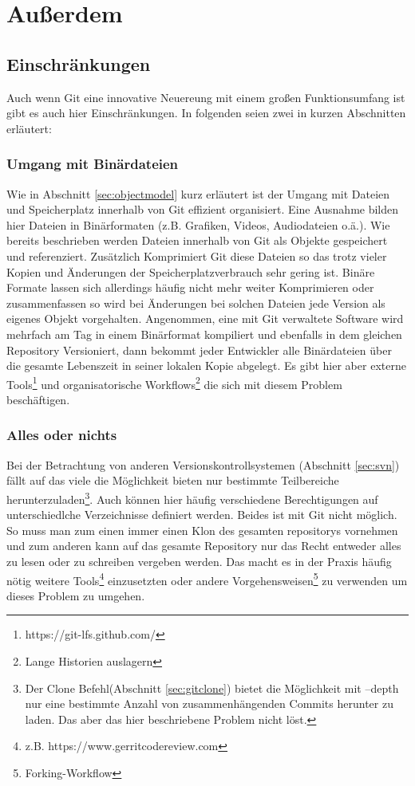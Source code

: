 \chapter{Außerdem}\label{cha:lookout}
\section{Einschränkungen}\label{sec:problems}
Auch wenn Git eine innovative Neuereung mit einem großen Funktionsumfang ist
gibt es auch hier Einschränkungen. In folgenden seien zwei in kurzen
Abschnitten erläutert:

\subsection{Umgang mit Binärdateien}\label{sec:binaries}
Wie in Abschnitt \ref{sec:objectmodel} kurz erläutert ist der Umgang mit
Dateien und Speicherplatz innerhalb von Git effizient organisiert. Eine
Ausnahme bilden hier Dateien in Binärformaten (z.B.  Grafiken, Videos,
Audiodateien o.ä.). Wie bereits beschrieben werden Dateien innerhalb von Git
als Objekte gespeichert und referenziert. Zusätzlich Komprimiert Git diese
Dateien so das trotz vieler Kopien und Änderungen der Speicherplatzverbrauch
sehr gering ist. Binäre Formate lassen sich allerdings häufig nicht mehr weiter
Komprimieren oder zusammenfassen so wird bei Änderungen bei solchen Dateien
jede Version als eigenes Objekt vorgehalten.  Angenommen, eine mit Git
verwaltete Software wird mehrfach am Tag in einem Binärformat kompiliert und
ebenfalls in dem gleichen Repository Versioniert, dann bekommt jeder Entwickler
alle Binärdateien über die gesamte Lebenszeit in seiner lokalen Kopie abgelegt.
Es gibt hier aber externe Tools\footnote{https://git-lfs.github.com/} und
organisatorische Workflows\footnote{Lange Historien
auslagern\cite[S.~235-244]{gitwf}} die sich mit diesem Problem
beschäftigen.\cite[S.~300]{gitwf}

\subsection{Alles oder nichts}
Bei der Betrachtung von anderen Versionskontrollsystemen (Abschnitt
\ref{sec:svn}) fällt auf das viele die Möglichkeit bieten nur bestimmte
Teilbereiche herunterzuladen\footnote{Der Clone Befehl(Abschnitt
\ref{sec:gitclone}) bietet die Möglichkeit mit --depth nur eine bestimmte
Anzahl von zusammenhängenden Commits herunter zu laden. Das aber das hier
beschriebene Problem nicht löst.\cite[S.~244]{gitwf}}. Auch können hier häufig
verschiedene Berechtigungen auf unterschiedlche Verzeichnisse definiert werden.
Beides ist mit Git nicht möglich. So muss man zum einen immer einen Klon des
gesamten \glspl{repository} vornehmen und zum anderen kann auf das gesamte
Repository nur das Recht entweder alles zu lesen oder zu schreiben vergeben
werden. Das macht es in der Praxis häufig nötig weitere Tools\footnote{z.B.
https://www.gerritcodereview.com} einzusetzten oder andere
Vorgehensweisen\footnote{Forking-Workflow\cite[S.~163-173]{gitwf}} zu verwenden
um dieses Problem zu umgehen.\cite[300-302]{gitwf}

